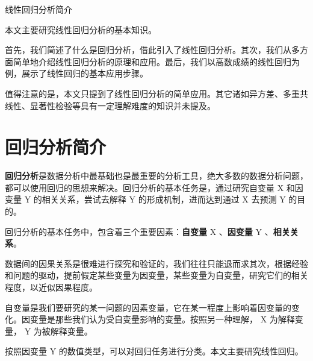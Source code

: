 \documentclass[withoutpreface]{cumcmthesis}
\begin{document}
\begin{abstractpage}{线性回归分析简介}

  本文主要研究线性回归分析的基本知识。

  首先，我们简述了什么是回归分析，借此引入了线性回归分析。其次，我们从多方面简单地介绍线性回归分析的原理和应用。最后，我们以高数成绩的线性回归为例，展示了线性回归的基本应用步骤。

  值得注意的是，本文只提到了线性回归分析的简单应用。其它诸如异方差、多重共线性、显著性检验等具有一定理解难度的知识并未提及。
  


\end{abstractpage}

\tocpage

\section{回归分析简介}
\textbf{回归分析}是数据分析中最基础也是最重要的分析工具，绝大多数的数据分析问题，都可以使用回归的思想来解决。回归分析的基本任务是，通过研究自变量 X 和因变量 Y 的相关关系，尝试去解释 Y 的形成机制，进而达到通过 X 去预测 Y 的目的。

回归分析的基本任务中，包含着三个重要因素：\textbf{自变量} X 、\textbf{因变量} Y 、\textbf{相关关系}。

数据间的因果关系是很难进行探究和验证的，我们往往只能退而求其次，根据经验和问题的驱动，提前假定某些变量为因变量，某些变量为自变量，研究它们的相关程度，以近似因果程度。

自变量是我们要研究的某一问题的因素变量，它在某一程度上影响着因变量的变化。因变量是那些我们认为受自变量影响的变量。按照另一种理解， X 为解释变量， Y 为被解释变量。

按照因变量 Y 的数值类型，可以对回归任务进行分类。本文主要研究线性回归。
\end{document}
